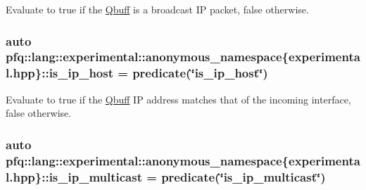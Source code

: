 Evaluate to {\ttfamily true} if the \hyperlink{structpfq_1_1lang_1_1Qbuff}{Qbuff} is a broadcast IP packet, {\ttfamily false} otherwise. 

\subsubsection[{\texorpdfstring{is\+\_\+ip\+\_\+host}{is_ip_host}}]{\setlength{\rightskip}{0pt plus 5cm}auto pfq\+::lang\+::experimental\+::anonymous\+\_\+namespace\{experimental.\+hpp\}\+::is\+\_\+ip\+\_\+host = {\bf predicate}(\char`\"{}is\+\_\+ip\+\_\+host\char`\"{})}\hypertarget{namespacepfq_1_1lang_1_1experimental_1_1anonymous__namespace_02experimental_8hpp_03_a323f07b8b6098198779c19fdf4c95837}{}\label{namespacepfq_1_1lang_1_1experimental_1_1anonymous__namespace_02experimental_8hpp_03_a323f07b8b6098198779c19fdf4c95837}


Evaluate to {\ttfamily true} if the \hyperlink{structpfq_1_1lang_1_1Qbuff}{Qbuff} IP address matches that of the incoming interface, {\ttfamily false} otherwise. 

\subsubsection[{\texorpdfstring{is\+\_\+ip\+\_\+multicast}{is_ip_multicast}}]{\setlength{\rightskip}{0pt plus 5cm}auto pfq\+::lang\+::experimental\+::anonymous\+\_\+namespace\{experimental.\+hpp\}\+::is\+\_\+ip\+\_\+multicast = {\bf predicate}(\char`\"{}is\+\_\+ip\+\_\+multicast\char`\"{})}\hypertarget{namespacepfq_1_1lang_1_1experimental_1_1anonymous__namespace_02experimental_8hpp_03_a6b14037fa990cc066d69c9f491345156}{}\label{namespacepfq_1_1lang_1_1experimental_1_1anonymous__namespace_02experimental_8hpp_03_a6b14037fa990cc066d69c9f491345156}


